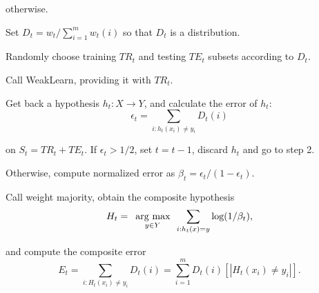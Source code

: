 \begin{algorithm}[]
{\begin{minipage}{0.97\linewidth}
\begin{algorithmic}[1]
						 \hspace{-6pt}otherwise.\vspace{8pt}
			
			
				\State Set $D_t= w_t / \displaystyle\sum_{i=1}^m w_t(i)$ so that 
							 $D_t$ is a distribution.\vspace{8pt}

				\State Randomly choose training $TR_t$ and testing $TE_t$ subsets 
							 according to $D_t$.\vspace{8pt}\label{l:random}
							 
				\State Call WeakLearn, providing it with $TR_t$.\vspace{8pt}
				
				\State Get back a hypothesis $h_t:X\rightarrow Y$, and calculate the 
							 error of $h_t$:\vspace{-10pt}
					\begin{equation*}
						\epsilon_t = \displaystyle\sum_{i:h_t(x_i)\neq y_i} D_t(i)
				  \end{equation*}
				  
					\vspace{-10pt}\hspace{14pt}on $S_t=TR_t+TE_t$. If $\epsilon_t>1/2$, 
					set $t=t-1$, discard $h_t$ and go to step 2. 
					
					\hspace{14pt}Otherwise, compute normalized error as $\beta_t = \epsilon_t / (1-\epsilon_t)$.\vspace{8pt}
				
				\State Call weight majority, obtain the composite hypothesis 
					\vspace{-10pt}
					\begin{equation*}
 						H_t = \begin{array}[t]{c}
										 \text{arg max}\\^{y\in Y}
									\end{array}
 									\displaystyle\sum_{i:h_t(x)=y} \text{log}(1/\beta_t),
				  \end{equation*}
				  
				  \vspace{-10pt}\hspace{14pt}and compute the composite error 
				  \vspace{-10pt}
					\begin{equation*}
						E_t = \displaystyle\sum_{i:H_t(x_i)\neq y_i} D_t(i) = 
						\displaystyle\sum_{i=1}^m D_t(i) \left[|H_t(x_i)\neq y_i | \right].
				  \end{equation*}
				  

\end{algorithmic}
\end{minipage}}
\end{algorithm}
